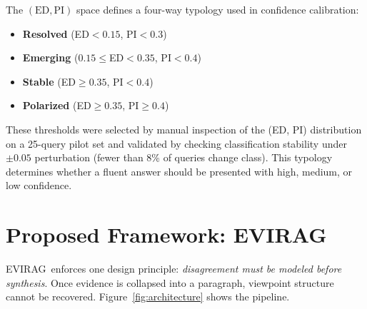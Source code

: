 \documentclass[11pt]{article}
\newcommand{\system}{\textsc{EVIRAG}\xspace}
\begin{document}
The $(\mathrm{ED},\mathrm{PI})$ space defines a four-way typology used in
confidence calibration:
\begin{itemize}[leftmargin=*,nosep]
  \item \textbf{Resolved} (ED$<0.15$, PI$<0.3$)
  \item \textbf{Emerging} ($0.15\leq$ED$<0.35$, PI$<0.4$)
  \item \textbf{Stable} (ED$\geq 0.35$, PI$<0.4$)
  \item \textbf{Polarized} (ED$\geq 0.35$, PI$\geq 0.4$)
\end{itemize}
These thresholds were selected by manual inspection of the (ED, PI)
distribution on a 25-query pilot set and validated by checking classification
stability under $\pm 0.05$ perturbation (fewer than 8\% of queries change
class).  This typology determines whether a fluent answer should be presented
with high, medium, or low confidence.

\section{Proposed Framework: \system}
\label{sec:system}

\system\ enforces one design principle: \emph{disagreement must be modeled
before synthesis}.  Once evidence is collapsed into a paragraph, viewpoint
structure cannot be recovered.  Figure~\ref{fig:architecture} shows the
pipeline.
\end{document}

